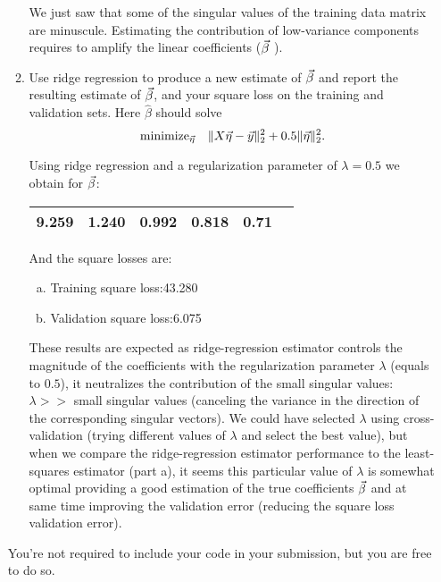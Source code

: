 \documentclass[12pt,twoside]{article}
\begin{document}
\begin{enumerate}
\begin{enumerate}
We just saw that some of the singular values of the training data matrix are minuscule. 
Estimating the contribution of low-variance components requires to amplify the linear coefficients ($\vec{\beta}$ ).
    
  \item Use ridge regression to produce a new estimate of $\vec{\beta}$
    and report the resulting estimate of $\vec{\beta}$, and
    your square loss on the training and validation sets.  Here
    $\hat{\beta}$ should solve
    $$\text{minimize}_{\vec{\eta}}\quad \|X\vec{\eta}-\vec{y}\|_2^2 + 0.5\|\vec{\eta}\|_2^2.$$
    
    Using ridge regression and a regularization parameter of $\lambda=0.5$ we obtain for $\vec{\beta}$:
     \begin{center}
    		\begin{tabular}{ | c | c | c | c | c | c | }
		\hline
			9.259 & 1.240 & 0.992 & 0.818 &  0.71 \\ 
		\hline
    	\end{tabular}
    \end{center}
    And the square losses are:
    \begin{enumerate}[(a)]
	\item Training square loss:43.280
	\item Validation square loss:6.075
    \end{enumerate}
  
  These results are expected as ridge-regression estimator controls the magnitude of the coefficients with the regularization parameter $\lambda$ (equals to $0.5$),
  it neutralizes the contribution of the small singular values: $\lambda >> $ small singular values (canceling the variance in the direction of the corresponding singular vectors).
  We could have selected $\lambda$ using cross-validation (trying different values of $\lambda$ and select the best value), 
  but  when we compare the ridge-regression estimator performance to the least-squares estimator (part a),
  it seems this particular value of $\lambda$ is somewhat optimal providing a good estimation of the true coefficients
   $\vec{\beta}$ and at same time improving the validation error (reducing the square loss validation error).
  

  \end{enumerate}
You're not required to include your code in your submission, but you are free to do so. 
 \end{enumerate}
\end{document}
